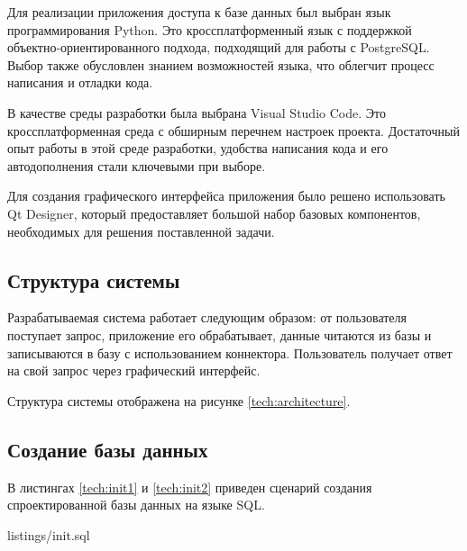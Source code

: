 Для реализации приложения доступа к базе данных был выбран язык программирования Python. Это кроссплатформенный язык с поддержкой объектно-ориентированного подхода, подходящий для работы с PostgreSQL. Выбор также обусловлен знанием возможностей языка, что облегчит процесс написания и отладки кода.

В качестве среды разработки была выбрана Visual Studio Code. Это кроссплатформенная среда с обширным перечнем настроек проекта. Достаточный опыт работы в этой среде разработки, удобства написания кода и его автодополнения стали ключевыми при выборе.

Для создания графического интерфейса приложения было решено использовать Qt Designer, который предоставляет большой набор базовых компонентов, необходимых для решения поставленной задачи.

\subsection{Структура системы}

Разрабатываемая система работает следующим образом: от пользователя поступает запрос, приложение его обрабатывает, данные читаются из базы и записываются в базу с использованием коннектора. Пользователь получает ответ на свой запрос через графический интерфейс.

Структура системы отображена на рисунке \ref{tech:architecture}.

\begin{figure}[H]
\end{figure}

\pagebreak

\subsection{Создание базы данных}

В листингах \ref{tech:init1} и \ref{tech:init2} приведен сценарий создания спроектированной базы данных на языке SQL.


{listings/init.sql}

